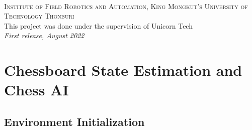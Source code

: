 \documentclass[11pt,fleqn]{book} %
\begin{document}
\newpage
~\vfill
\thispagestyle{empty}


\noindent \textsc{Institute of Field Robotics and Automation, King Mongkut's University of Technology Thonburi}\\


\noindent This project was done under the supervision of Unicorn Tech\\ %

\noindent \textit{First release, August 2022} %



\pagestyle{empty} %

\tableofcontents %


\pagestyle{fancy} %


\chapter{Chessboard State Estimation and Chess AI}
\section{Environment Initialization}
\end{document}

